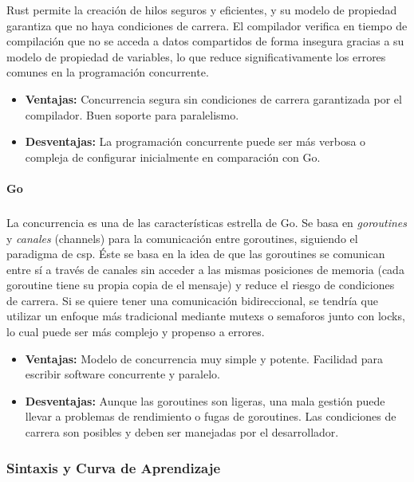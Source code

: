 Rust permite la creación de hilos seguros y eficientes, y su modelo de propiedad garantiza que no haya condiciones de carrera. El compilador verifica en tiempo de compilación que no se acceda a datos compartidos de forma insegura gracias a su modelo de propiedad de variables, lo que reduce significativamente los errores comunes en la programación concurrente.
\begin{itemize}
    \item \textbf{Ventajas:} Concurrencia segura sin condiciones de carrera garantizada por el compilador. Buen soporte para paralelismo.
    \item \textbf{Desventajas:} La programación concurrente puede ser más verbosa o compleja de configurar inicialmente en comparación con Go.
\end{itemize}

\paragraph{Go}
\subparagraph{}

La concurrencia es una de las características estrella de Go. Se basa en \textit{goroutines} y \textit{canales} (channels) para la comunicación entre goroutines, siguiendo el paradigma de \acrfull{csp}.
Éste se basa en la idea de que las goroutines se comunican entre sí a través de canales sin acceder a las mismas posiciones de memoria (cada goroutine tiene su propia copia de el mensaje) y reduce el riesgo de condiciones de carrera.
Si se quiere tener una comunicación bidireccional, se tendría que utilizar un enfoque más tradicional mediante \glspl{mutex} o \glspl{semaforo} junto con \glspl{lock}, lo cual puede ser más complejo y propenso a errores.
\begin{itemize}
    \item \textbf{Ventajas:} Modelo de concurrencia muy simple y potente. Facilidad para escribir software concurrente y paralelo.
    \item \textbf{Desventajas:} Aunque las goroutines son ligeras, una mala gestión puede llevar a problemas de rendimiento o fugas de goroutines. Las condiciones de carrera son posibles y deben ser manejadas por el desarrollador.
\end{itemize}

\subsubsection{Sintaxis y Curva de Aprendizaje}
